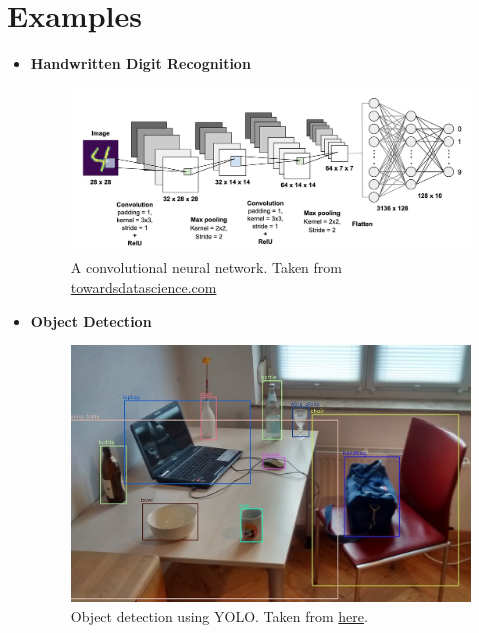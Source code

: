 \documentclass{article}
\begin{document}
    \section{Examples}
        \begin{itemize}
            \item \textbf{Handwritten Digit Recognition}
                \begin{figure}[h]
                    \includegraphics[width = \textwidth]{Recognition.png}
                    \caption{A convolutional neural network. Taken from \href{https://towardsdatascience.com/mnist-handwritten-digits-classification-using-a-convolutional-neural-network-cnn-af5fafbc35e9}{towardsdatascience.com}}
                \end{figure}
            
            \clearpage
            
            \item \textbf{Object Detection}
                
                \begin{figure}[h]
                    \includegraphics[width = \textwidth]{yolo.jpg}
                    \caption{Object detection using YOLO. Taken from \href{https://commons.wikimedia.org/wiki/File:Detected-with-YOLO--Schreibtisch-mit-Objekten.jpg}{here}.}
                \end{figure}
            

\end{itemize}
\end{document}
